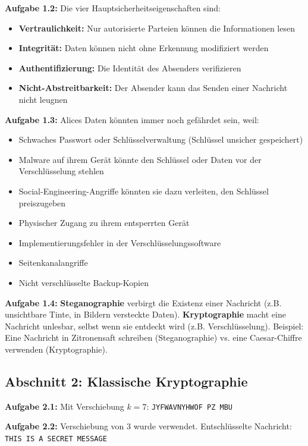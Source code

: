 \documentclass[11pt,a4paper]{report}
\begin{document}
\textbf{Aufgabe 1.2:}
Die vier Hauptsicherheitseigenschaften sind:
\begin{itemize}
    \item \textbf{Vertraulichkeit:} Nur autorisierte Parteien können die Informationen lesen
    \item \textbf{Integrität:} Daten können nicht ohne Erkennung modifiziert werden
    \item \textbf{Authentifizierung:} Die Identität des Absenders verifizieren
    \item \textbf{Nicht-Abstreitbarkeit:} Der Absender kann das Senden einer Nachricht nicht leugnen
\end{itemize}

\textbf{Aufgabe 1.3:}
Alices Daten könnten immer noch gefährdet sein, weil:
\begin{itemize}
    \item Schwaches Passwort oder Schlüsselverwaltung (Schlüssel unsicher gespeichert)
    \item Malware auf ihrem Gerät könnte den Schlüssel oder Daten vor der Verschlüsselung stehlen
    \item Social-Engineering-Angriffe könnten sie dazu verleiten, den Schlüssel preiszugeben
    \item Physischer Zugang zu ihrem entsperrten Gerät
    \item Implementierungsfehler in der Verschlüsselungssoftware
    \item Seitenkanalangriffe
    \item Nicht verschlüsselte Backup-Kopien
\end{itemize}

\textbf{Aufgabe 1.4:}
\textbf{Steganographie} verbirgt die Existenz einer Nachricht (z.B. unsichtbare Tinte, in Bildern versteckte Daten). \textbf{Kryptographie} macht eine Nachricht unlesbar, selbst wenn sie entdeckt wird (z.B. Verschlüsselung). Beispiel: Eine Nachricht in Zitronensaft schreiben (Steganographie) vs. eine Caesar-Chiffre verwenden (Kryptographie).

\subsection*{Abschnitt 2: Klassische Kryptographie}

\textbf{Aufgabe 2.1:}
Mit Verschiebung $k=7$: \texttt{JYFWAVNYHWOF PZ MBU}

\textbf{Aufgabe 2.2:}
Verschiebung von 3 wurde verwendet. Entschlüsselte Nachricht: \texttt{THIS IS A SECRET MESSAGE}
\end{document}
